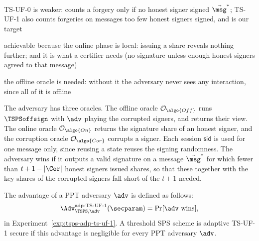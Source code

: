 \begin{outline}
  \item TS-UF-0 is weaker: counts a forgery only if no honest signer signed
$\vec{\msg}^*$; TS-UF-1 also counts forgeries on messages too few honest signers
signed, and is our target
  \item achievable because the online phase is local: issuing a share reveals
nothing further; and it is what a certifier needs (no signature unless
enough honest signers agreed to that message)
  \item the offline oracle is needed: without it the adversary never sees any
interaction, since all of it is offline
\end{outline}

The adversary has three oracles. The offline oracle $\mathcal{O}_{\algo{Off}}$
runs $\TSPSoffsign$ with $\adv$ playing the corrupted signers, and returns their
view. The online oracle $\mathcal{O}_{\algo{On}}$ returns the signature share of
an honest signer, and the corruption oracle $\mathcal{O}_{\algo{Cor}}$ corrupts a
signer. Each session $\mathsf{sid}$ is used for one message only, since reusing a
state reuses the signing randomness. The adversary wins if it outputs a valid
signature on a message $\vec{\msg}^*$ for which fewer than $t + 1 - |\Cor|$
honest signers issued shares, so that these together with the key shares of the
corrupted signers fall short of the $t+1$ needed.

The advantage of a PPT adversary $\adv$ is defined as follows:
%
\begin{equation*}
%
  \Adv_{\TSPS, \adv}^{\text{adp-TS-UF-1}}(\secparam) = \Pr[\adv\text{ wins}],
%
\end{equation*}
%
in Experiment~\ref{exp:tsps-adp-ts-uf-1}. A threshold SPS scheme is adaptive TS-UF-1 secure if this advantage is negligible for
every PPT adversary $\adv$.

